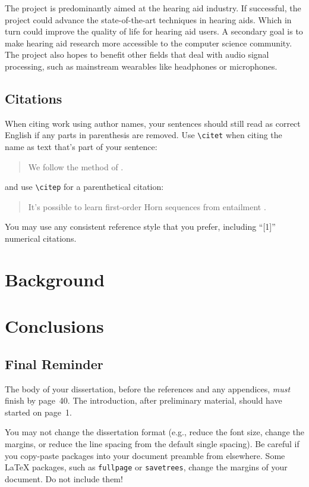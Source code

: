 \documentclass[logo,bsc,singlespacing,parskip,online]{infthesis}
\begin{document}
The project is predominantly aimed at the hearing aid industry. If successful, the project
could advance the state-of-the-art techniques in hearing aids.
Which in turn could improve the quality of life for hearing aid users.
A secondary goal is to make hearing aid research more accessible to the 
computer science community.
The project also hopes to benefit other fields that deal with audio signal processing,
such as mainstream wearables like headphones or microphones.

\section{Citations}

When citing work using author names, your sentences should still read
as correct English if any parts in parenthesis are removed.
Use {\tt {\textbackslash}citet} when citing the name as text that's part of your sentence: 
\begin{quote}
  We follow the method of \citet{P1}.
\end{quote}
and use {\tt {\textbackslash}citep} for a parenthetical citation:
\begin{quote}
  It's possible to learn first-order Horn sequences from entailment \citep{P2}.
\end{quote}

You may use any consistent reference style that you prefer, including ``[1]'' numerical citations. 

\chapter{Background}

\chapter{Conclusions}

\section{Final Reminder}

The body of your dissertation, before the references and any appendices,
\emph{must} finish by page~40. The introduction, after preliminary material,
should have started on page~1.

You may not change the dissertation format (e.g., reduce the font size, change
the margins, or reduce the line spacing from the default single spacing). Be
careful if you copy-paste packages into your document preamble from elsewhere.
Some \LaTeX{} packages, such as \texttt{fullpage} or \texttt{savetrees}, change
the margins of your document. Do not include them!
\end{document}
